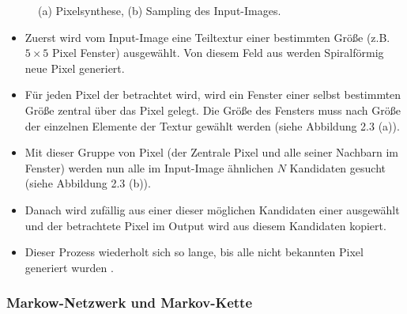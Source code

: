 \documentclass[12pt, a4paper,twoside,openany]{report} %
\begin{document}
\begin{figure}[H]
    \centering
    \qquad
    \caption{(a) Pixelsynthese, (b) Sampling des Input-Images.}%
\end{figure}


\begin{itemize}
    \item Zuerst wird vom Input-Image eine Teiltextur einer bestimmten Größe {(z.B. $5\times 5$ Pixel Fenster)} ausgewählt. Von diesem Feld aus werden Spiralförmig neue Pixel generiert.
    \item Für jeden Pixel der betrachtet wird, wird ein Fenster einer selbst bestimmten Größe zentral über das Pixel gelegt. 
    Die Größe des Fensters muss nach Größe der einzelnen Elemente der Textur gewählt werden  {(siehe Abbildung 2.3 (a))}.
    \item Mit dieser Gruppe von Pixel {(der Zentrale Pixel und alle seiner Nachbarn im Fenster)} werden nun alle im Input-Image ähnlichen $N$ Kandidaten gesucht {(siehe Abbildung 2.3 (b))}.
    \item Danach wird zufällig aus einer dieser möglichen Kandidaten einer ausgewählt und der betrachtete Pixel im Output wird aus diesem Kandidaten kopiert.
    \item Dieser Prozess wiederholt sich so lange, bis alle nicht bekannten Pixel generiert wurden \cite[S.4]{GomathiShah2009}.
\end{itemize}

\subsubsection{Markow-Netzwerk und Markov-Kette}
\end{document}
